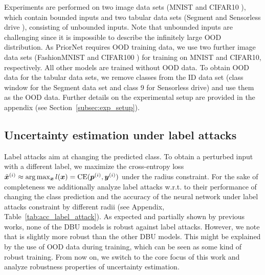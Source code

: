 Experiments are performed on two image data sets (MNIST \citep{mnist} and CIFAR10 \citep{cifar10}), which contain bounded inputs and two tabular data sets (Segment \citep{uci_datasets} and Sensorless drive \citep{uci_datasets}), consisting of unbounded inputs. Note that unbounded inputs are challenging since it is impossible to describe the infinitely large OOD distribution. As PriorNet requires OOD training data, we use two further image data sets (FashionMNIST \citep{fashionmnist} and CIFAR100 \citep{cifar10}) for training on MNIST and CIFAR10, respectively. All other models are trained without OOD data. To obtain OOD data for the tabular data sets, we remove classes from the ID data set (class window for the Segment data set and class 9 for Sensorless drive) and use them as the OOD data. Further details on the experimental setup are provided in the appendix (see Section~\ref{subsec:exp_setup}).



 


\subsection{Uncertainty estimation under label attacks}
\label{subsec:label_attacks}
%
Label attacks aim at changing the predicted class. To obtain a perturbed input with a different label, we maximize the cross-entropy loss $\tilde{{\bm{x}}}^{(i)} \approx \arg\max_{{\bm{x}}} l({\bm{x}}) = \text{CE}({\bm{p}}^{(i)}, {\bm{y}}^{(i)})$ under the radius constraint. For the sake of completeness we additionally analyze label attacks w.r.t. to their performance of changing the class prediction and the accuracy of the neural network under label attacks constraint by different radii (see Appendix, Table~\ref{tab:acc_label_attack}). As expected and partially shown by previous works, none of the DBU models is robust against label attacks. %
However, we note that \PriorNet is slightly more robust than the other DBU models. This might be explained by the use of OOD data during training, which can be seen as some kind of robust training. 
%
From now on, we switch to the core focus of this work and analyze robustness properties of uncertainty estimation. 




